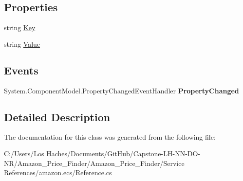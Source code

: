 \subsection*{Properties}
\begin{DoxyCompactItemize}
\item 
\hypertarget{class_amazon___price___finder_1_1amazon_1_1ecs_1_1_cart_create_request_item_meta_data_aa79cb6b86d92ec2e0b868ea6b873a4c6}{string \hyperlink{class_amazon___price___finder_1_1amazon_1_1ecs_1_1_cart_create_request_item_meta_data_aa79cb6b86d92ec2e0b868ea6b873a4c6}{Key}}\label{class_amazon___price___finder_1_1amazon_1_1ecs_1_1_cart_create_request_item_meta_data_aa79cb6b86d92ec2e0b868ea6b873a4c6}

\begin{DoxyCompactList}\small\item\em \end{DoxyCompactList}\item 
\hypertarget{class_amazon___price___finder_1_1amazon_1_1ecs_1_1_cart_create_request_item_meta_data_a90b8a4a1549f88a75f45c03e6a944959}{string \hyperlink{class_amazon___price___finder_1_1amazon_1_1ecs_1_1_cart_create_request_item_meta_data_a90b8a4a1549f88a75f45c03e6a944959}{Value}}\label{class_amazon___price___finder_1_1amazon_1_1ecs_1_1_cart_create_request_item_meta_data_a90b8a4a1549f88a75f45c03e6a944959}

\begin{DoxyCompactList}\small\item\em \end{DoxyCompactList}\end{DoxyCompactItemize}
\subsection*{Events}
\begin{DoxyCompactItemize}
\item 
\hypertarget{class_amazon___price___finder_1_1amazon_1_1ecs_1_1_cart_create_request_item_meta_data_a45b1033d696031ce241098bb75662d24}{System.\-Component\-Model.\-Property\-Changed\-Event\-Handler {\bfseries Property\-Changed}}\label{class_amazon___price___finder_1_1amazon_1_1ecs_1_1_cart_create_request_item_meta_data_a45b1033d696031ce241098bb75662d24}

\end{DoxyCompactItemize}


\subsection{Detailed Description}


The documentation for this class was generated from the following file\-:\begin{DoxyCompactItemize}
\item 
C\-:/\-Users/\-Los Haches/\-Documents/\-Git\-Hub/\-Capstone-\/\-L\-H-\/\-N\-N-\/\-D\-O-\/\-N\-R/\-Amazon\-\_\-\-Price\-\_\-\-Finder/\-Amazon\-\_\-\-Price\-\_\-\-Finder/\-Service References/amazon.\-ecs/Reference.\-cs\end{DoxyCompactItemize}
